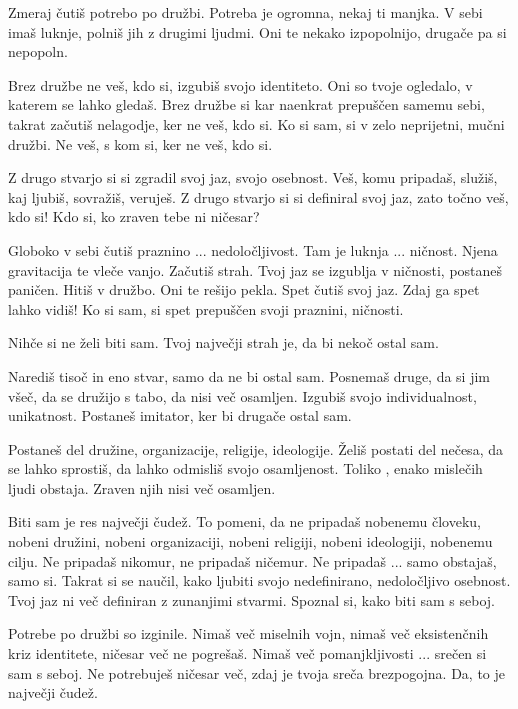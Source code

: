         

   Zmeraj čutiš potrebo po družbi. Potreba je ogromna, nekaj ti manjka. V sebi imaš luknje, polniš jih z drugimi ljudmi. Oni te nekako izpopolnijo, drugače pa si nepopoln. 

Brez družbe ne veš, kdo si, izgubiš svojo identiteto. Oni so tvoje ogledalo, v katerem se lahko gledaš. Brez družbe si kar naenkrat prepuščen samemu sebi, takrat začutiš nelagodje, ker ne veš, kdo si. Ko si sam, si v zelo neprijetni, mučni družbi. Ne veš, s kom si, ker ne veš, kdo si. 

Z drugo stvarjo si si zgradil svoj jaz, svojo osebnost. Veš, komu pripadaš, služiš, kaj ljubiš, sovražiš, veruješ. Z drugo stvarjo si si definiral svoj jaz, zato točno veš, kdo si! Kdo si, ko zraven tebe ni ničesar? 

Globoko v sebi čutiš praznino ... nedoločljivost. Tam je luknja ... ničnost. Njena gravitacija te vleče vanjo. Začutiš strah. Tvoj jaz se izgublja v ničnosti, postaneš paničen. Hitiš v družbo. Oni te rešijo pekla. Spet čutiš svoj jaz. Zdaj ga spet lahko vidiš! Ko si sam, si spet prepuščen svoji praznini, ničnosti. 

Nihče si ne želi biti sam. Tvoj največji strah je, da bi nekoč ostal sam. 

Narediš tisoč in eno stvar, samo da ne bi ostal sam. Posnemaš druge, da si jim všeč, da se družijo s tabo, da nisi več osamljen. Izgubiš svojo individualnost, unikatnost. Postaneš imitator, ker bi drugače ostal sam. 

Postaneš del družine, organizacije, religije, ideologije. Želiš postati del nečesa, da se lahko sprostiš, da lahko odmisliš svojo osamljenost. Toliko , enako mislečih ljudi obstaja. Zraven njih nisi več osamljen. 

Biti sam je res največji čudež. To pomeni, da ne pripadaš nobenemu človeku, nobeni družini, nobeni organizaciji, nobeni religiji, nobeni ideologiji, nobenemu cilju. Ne pripadaš nikomur, ne pripadaš ničemur. Ne pripadaš ... samo obstajaš, samo si. Takrat si se naučil, kako ljubiti svojo nedefinirano, nedoločljivo osebnost. Tvoj jaz ni več definiran z zunanjimi stvarmi. Spoznal si, kako biti sam s seboj. 

Potrebe po družbi so izginile. Nimaš več miselnih vojn, nimaš več eksistenčnih kriz identitete, ničesar več ne pogrešaš. Nimaš več pomanjkljivosti ... srečen si sam s seboj. Ne potrebuješ ničesar več, zdaj je tvoja sreča brez\-po\-goj\-na. Da, to je največji čudež. 

